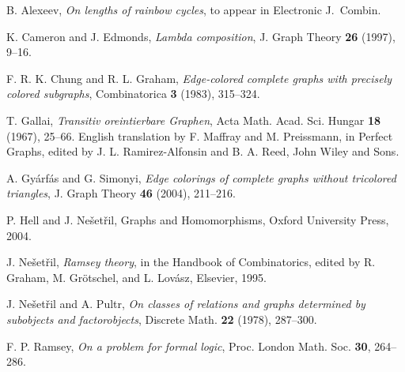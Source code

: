 \documentclass[12pt]{amsart}
\theoremstyle{plain}
\numberwithin{equation}{section}
\begin{document}
\begin{thebibliography}{9}

 B. Alexeev, \emph{On lengths of rainbow cycles}, to
appear in Electronic J.~Combin.

K. Cameron and J. Edmonds, \emph{Lambda
composition}, J. Graph Theory \textbf{26} (1997), 9--16.

F. R. K. Chung and R. L. Graham, \emph{Edge-colored
complete graphs with precisely colored subgraphs}, Combinatorica \textbf{3}
(1983), 315--324.

T. Gallai, \emph{Transitiv oreintierbare Graphen}, Acta
Math. Acad. Sci. Hungar \textbf{18} (1967), 25--66. English translation by F.
Maffray and M. Preissmann, in Perfect Graphs, edited by J. L. Ramirez-Alfonsin
and B. A. Reed, John Wiley and Sons.

A. Gy\'{a}rf\'{a}s and G. Simonyi, \emph{Edge
colorings of complete graphs without tricolored triangles}, J. Graph Theory
\textbf{46} (2004), 211--216.

P. Hell and J. Ne\v{s}et\v{r}il, Graphs and
Homomorphisms, Oxford University Press, 2004.

J. Ne\v{s}et\v{r}il, \emph{Ramsey theory}, in the
Handbook of Combinatorics, edited by R. Graham, M. Gr\"{o}tschel, and L.
Lov\'{a}sz, Elsevier, 1995.

J. Ne\v{s}et\v{r}il and A. Pultr, \emph{On
classes of relations and graphs determined by subobjects and factorobjects},
Discrete Math. \textbf{22} (1978), 287--300.

F. P. Ramsey, \emph{On a problem for formal logic},
Proc. London Math. Soc. \textbf{30}, 264--286.
\end{thebibliography}
\end{document}
